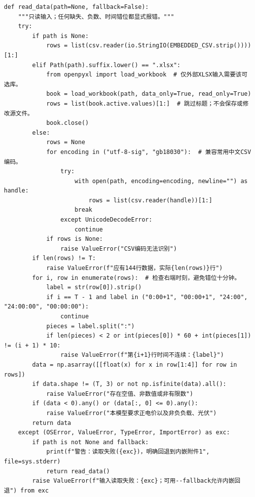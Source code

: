 \documentclass[withoutpreface,bwprint]{cumcmthesis}
\begin{document}
\begin{appendices}
\begin{lstlisting}
def read_data(path=None, fallback=False):
    """只读输入；任何缺失、负数、时间错位都显式报错。"""
    try:
        if path is None:
            rows = list(csv.reader(io.StringIO(EMBEDDED_CSV.strip())))[1:]
        elif Path(path).suffix.lower() == ".xlsx":
            from openpyxl import load_workbook  # 仅外部XLSX输入需要该可选库。
            book = load_workbook(path, data_only=True, read_only=True)
            rows = list(book.active.values)[1:]  # 跳过标题；不会保存或修改源文件。
            book.close()
        else:
            rows = None
            for encoding in ("utf-8-sig", "gb18030"):  # 兼容常用中文CSV编码。
                try:
                    with open(path, encoding=encoding, newline="") as handle:
                        rows = list(csv.reader(handle))[1:]
                    break
                except UnicodeDecodeError:
                    continue
            if rows is None:
                raise ValueError("CSV编码无法识别")
        if len(rows) != T:
            raise ValueError(f"应有144行数据，实际{len(rows)}行")
        for i, row in enumerate(rows):  # 检查右端时刻，避免错位十分钟。
            label = str(row[0]).strip()
            if i == T - 1 and label in ("0:00+1", "00:00+1", "24:00", "24:00:00", "00:00:00"):
                continue
            pieces = label.split(":")
            if len(pieces) < 2 or int(pieces[0]) * 60 + int(pieces[1]) != (i + 1) * 10:
                raise ValueError(f"第{i+1}行时间不连续：{label}")
        data = np.asarray([[float(x) for x in row[1:4]] for row in rows])
        if data.shape != (T, 3) or not np.isfinite(data).all():
            raise ValueError("存在空值、非数值或非有限数")
        if (data < 0).any() or (data[:, 0] <= 0).any():
            raise ValueError("本模型要求正电价以及非负负载、光伏")
        return data
    except (OSError, ValueError, TypeError, ImportError) as exc:
        if path is not None and fallback:
            print(f"警告：读取失败({exc})，明确回退到内嵌附件1", file=sys.stderr)
            return read_data()
        raise ValueError(f"输入读取失败：{exc}；可用--fallback允许内嵌回退") from exc



\end{lstlisting}
\end{appendices}
\end{document}
